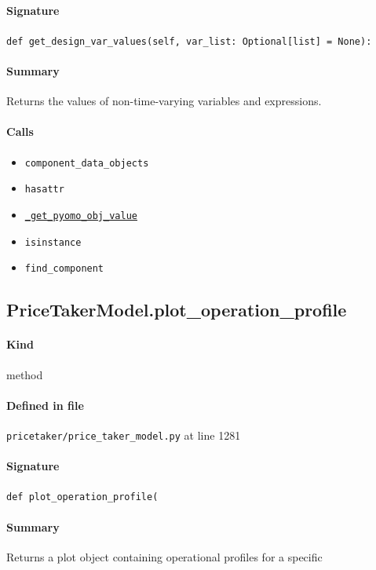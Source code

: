 \documentclass[11pt]{report}
\begin{document}
\paragraph{Signature} \texttt{def get\_design\_var\_values(self, var\_list: Optional[list] = None):}
\paragraph{Summary} Returns the values of non-time-varying variables and expressions.
\paragraph{Calls}
\begin{itemize}[leftmargin=*]
  \item \texttt{component\_data\_objects}
  \item \texttt{hasattr}
  \item \hyperref[def:pricetaker-price_taker_model.py:PriceTakerModel._get_pyomo_obj_value:L1191]{\texttt{\_get\_pyomo\_obj\_value}}
  \item \texttt{isinstance}
  \item \texttt{find\_component}
\end{itemize}
\subsection{PriceTakerModel.plot\_operation\_profile}
\label{def:pricetaker-price_taker_model.py:PriceTakerModel.plot_operation_profile:L1281}
\paragraph{Kind} method
\paragraph{Defined in file} \texttt{pricetaker/price\_taker\_model.py} at line 1281
\paragraph{Signature} \texttt{def plot\_operation\_profile(}
\paragraph{Summary} Returns a plot object containing operational profiles for a specific
\end{document}
